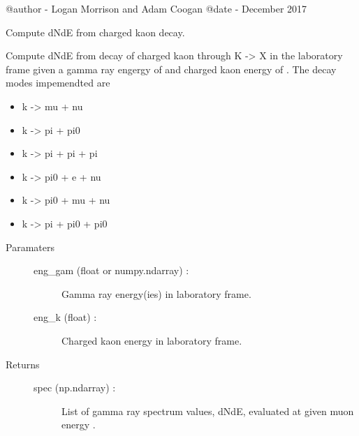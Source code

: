 \documentclass[letterpaper,10pt,english]{sphinxmanual}
\begin{document}
@author - Logan Morrison and Adam Coogan
@date - December 2017

\begin{fulllineitems}
\label{\detokenize{modules:hazma.charged_kaon.decay_spectra}}
Compute dNdE from charged kaon decay.

Compute dNdE from decay of charged kaon through K -\textgreater{} X in the laboratory
frame given a gamma ray engergy of  and charged kaon energy of
. The decay modes impemendted are
\begin{itemize}
\item {} 
k -\textgreater{} mu  + nu

\item {} 
k -\textgreater{} pi  + pi0

\item {} 
k -\textgreater{} pi  + pi  + pi

\item {} 
k -\textgreater{} pi0 + e   + nu

\item {} 
k -\textgreater{} pi0 + mu  + nu

\item {} 
k -\textgreater{} pi  + pi0 + pi0

\end{itemize}
\begin{description}
\item[{Paramaters}] \leavevmode\begin{description}
\item[{eng\_gam (float or numpy.ndarray) :}] \leavevmode
Gamma ray energy(ies) in laboratory frame.

\item[{eng\_k (float) :}] \leavevmode
Charged kaon energy in laboratory frame.

\end{description}

\item[{Returns}] \leavevmode\begin{description}
\item[{spec (np.ndarray) :}] \leavevmode
List of gamma ray spectrum values, dNdE, evaluated at 
given muon energy .

\end{description}

\end{description}

\end{fulllineitems}
\end{document}
